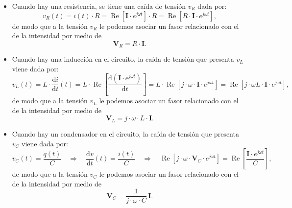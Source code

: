 \begin{itemize}
  \item Cuando hay una resistencia, se tiene una caída de tensión $v_R$ dada por:
    \[
    v_R(t) = i(t)\cdot  R = \operatorname{Re}\left[\mathbf{I}\cdot e^{j\omega t}\right]\cdot R = \operatorname{Re}\left[R\cdot \mathbf{I}\cdot e^{j\omega t}\right],
    \]
    de modo que a la tensión $v_R$ le podemos asociar un fasor relacionado con el de la intensidad por medio de
    \begin{equation}
      \label{eq:FasorVR}
      \mathbf{V}_R = R\cdot \mathbf{I}.
    \end{equation}

  \item Cuando hay una inducción en el circuito, la caída de tensión que presenta $v_L$ viene dada por:
    \[
    v_L(t) = L \cdot \frac{\text{d}i}{\text{d}t}(t) = L \cdot \operatorname{Re} \left[\frac{\text{d} (\mathbf{I}\cdot e^{j\omega t})}{\text{d}t}\right] = L \cdot  \operatorname{Re} \left[j\cdot \omega\cdot \mathbf{I}\cdot e^{j\omega t}\right] =   \operatorname{Re} \left[j\cdot \omega L\cdot \mathbf{I} \cdot e^{j\omega t}\right],
    \]
    de modo que a la tensión $v_L$ le podemos asociar un fasor relacionado con el de la intensidad por medio de
    \begin{equation}
      \label{eq:FasorVL}
      \mathbf{V}_L = j \cdot \omega \cdot L\cdot\mathbf{I}.
    \end{equation}

  \item Cuando hay un condensador en el circuito, la caída de tensión que presenta $v_C$ viene dada por:
    \[
    v_C(t) = \frac{q(t)}{C} \quad \Longrightarrow \quad  \frac{\text{d}v}{\text{d}t}(t) = \frac{i(t)}{C}  \quad \Longrightarrow \quad \operatorname{Re}\left[j\cdot \omega\cdot \mathbf{V}_C\cdot e^{j\omega t}\right] = \operatorname{Re} \left[\frac{\mathbf{I}\cdot e^{j\omega t}}{C}\right],
    \]
    de modo que a la tensión $v_C$ le podemos asociar un fasor relacionado con el de la intensidad por medio de
    \begin{equation}
      \label{eq:FasorVC}
      \mathbf{V}_C = \frac{1}{j\cdot  \omega \cdot C}\,\mathbf{I}.
    \end{equation}
\end{itemize}

